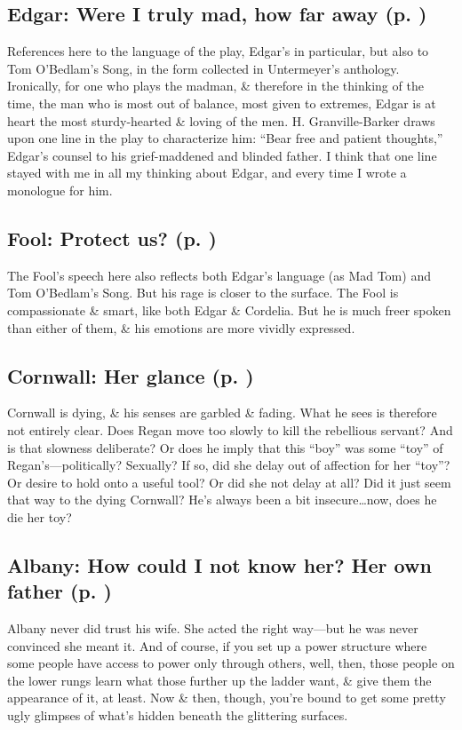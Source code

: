 \subsection{Edgar: Were I truly mad, how far away (p. \pageref{ch:lear_ap})}
References here to the language of the play, Edgar's in particular, but also to Tom O'Bedlam's Song, in the form collected in Untermeyer's anthology. Ironically, for one who plays the madman, \& therefore in the thinking of the time, the man who is most out of balance, most given to extremes, Edgar is at heart the most sturdy-hearted \& loving of the men. H. Granville-Barker draws upon one line in the play to characterize him: ``Bear free and patient thoughts,'' Edgar's counsel to his grief-maddened and blinded father. I think that one line stayed with me in all my thinking about Edgar, and every time I wrote a monologue for him.

\subsection{Fool: Protect us? (p. \pageref{ch:lear_aq})}
The Fool's speech here also reflects both Edgar's language (as Mad Tom) and Tom O'Bedlam's Song. But his rage is closer to the surface. The Fool is compassionate \& smart, like both Edgar \& Cordelia. But he is much freer spoken than either of them, \& his emotions are more vividly expressed.

\subsection{Cornwall: Her glance (p. \pageref{ch:lear_ar})}
Cornwall is dying, \& his senses are garbled \& fading. What he sees is therefore not entirely clear. Does Regan move too slowly to kill the rebellious servant? And is that slowness deliberate? Or does he imply that this ``boy'' was some ``toy'' of Regan's---politically? Sexually? If so, did she delay out of affection for her ``toy''? Or desire to hold onto a useful tool? Or did she not delay at all? Did it just seem that way to the dying Cornwall? He's always been a bit insecure\ldots{}now, does he die her toy?

\subsection{Albany: How could I not know her? Her own father (p. \pageref{ch:lear_as})}
Albany never did trust his wife. She acted the right way---but he was never convinced she meant it. And of course, if you set up a power structure where some people have access to power only through others, well, then, those people on the lower rungs learn what those further up the ladder want, \& give them the appearance of it, at least. Now \& then, though, you're bound to get some pretty ugly glimpses of what's hidden beneath the glittering surfaces.

